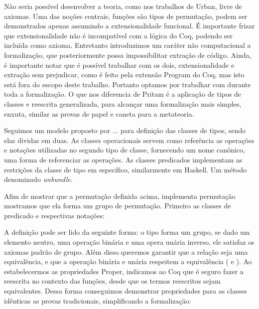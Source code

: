 Não seria possível desenvolver a teoria, como nos trabalhos de Urban, livre de axiomas. Uma das noções centrais, funções são tipos de permutação, podem ser demonstrados apenas assumindo a extensionalidade funcional. É importante frisar que extensionalidade não é incompatível com a lógica do Coq, podendo ser incluída como axioma. Entretanto introduzimos um caráter não computacional a formalização, que posteriormente possa impossibilitar extração de código. Ainda, é importante notar que é possível trabalhar com os dois, extensionalidade e extração sem prejudicar, como é feito pela extensão Program do Coq, mas isto está fora do escopo deste trabalho. Portanto optamos por trabalhar com \setoids durante toda a formalização. O que nos diferencia de Pritam é a aplicação de tipos de classes e reescrita generalizada, para alcançar uma formalização mais simples, enxuta, similar as provas de papel e caneta para a metateoria.

Seguimos um modelo proposto por ... para definição das classes de tipos, sendo elas dividas em duas. As classes operacionais servem como referência as operações e notações utilizadas no segundo tipo de classe, fornecendo um nome canônico, uma forma de referenciar as operações. As classes predicados implementam as restrições da classe de tipo em específico, similarmente em Haskell. Um método denominado \textit{unbundle}.

Afim de mostrar que a permutação definida acima, implementa permutação mostramos que ela forma um grupo de permutação. Primeiro as classes de predicado e respectivas notações:

A definição  pode ser lido da seguinte forma: o tipo  forma um grupo, se dado um elemento neutro, uma operação binária e uma opera unária inverso, ele satisfaz os axiomas padrão de grupo. Além disso queremos garantir que a relação seja uma equivalência, e que a operação binária e unária respeitem a equivalência ( e ). Ao estabelecermos as propriedades Proper, indicamos ao Coq que é seguro fazer a reescrita no contexto das funções, desde que os termos reescritos sejam equivalentes. Dessa forma conseguimos demonstrar propriedades para as classes idênticas as provas tradicionais, simplificando a formalização: 